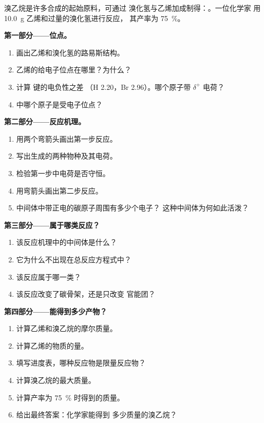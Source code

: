 \begin{problem}
\label{pb:g12:curly-arrows:1}
溴乙烷是许多合成的起始原料，可通过
溴化氢与乙烯加成制得：。一位化学家
用 \qty{10.0}{g} 乙烯和过量的溴化氢进行反应，
其产率为 \qty{75}{\percent}。

\medskip
\noindent\textbf{第一部分——位点。}
\begin{enumerate}
  \item 画出乙烯和溴化氢的路易斯结构。
  \item 乙烯的给电子位点在哪里？为什么？
  \item 计算  键的电负性之差
        （H 2.20，Br 2.96）。哪个原子带 $\delta^+$ 电荷？
  \item {} 中哪个原子是受电子位点？
\end{enumerate}

\medskip
\noindent\textbf{第二部分——反应机理。}
\begin{enumerate}[resume]
  \item 用两个弯箭头画出第一步反应。
  \item 写出生成的两种物种及其电荷。
  \item 检验第一步中电荷是否守恒。
  \item 用弯箭头画出第二步反应。
  \item 中间体中带正电的碳原子周围有多少个电子？
        这种中间体为何如此活泼？
\end{enumerate}

\medskip
\noindent\textbf{第三部分——属于哪类反应？}
\begin{enumerate}[resume]
  \item 该反应机理中的中间体是什么？
  \item 它为什么不出现在总反应方程式中？
  \item 该反应属于哪一类？
  \item 该反应改变了碳骨架，还是只改变
        官能团？
\end{enumerate}

\medskip
\noindent\textbf{第四部分——能得到多少产物？}
\begin{enumerate}[resume]
  \item 计算乙烯和溴乙烷的摩尔质量。
  \item 计算乙烯的物质的量。
  \item 填写进度表，哪种反应物是限量反应物？
  \item 计算溴乙烷的最大质量。
  \item 计算产率为 \qty{75}{\percent} 时得到的质量。
  \item 给出最终答案：化学家能得到
        多少质量的溴乙烷？
\end{enumerate}
\end{problem}

